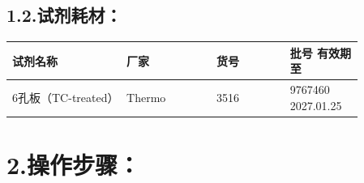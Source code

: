 \documentclass[UTF8,10pt,a4paper,fontset=fandol]{ctexart}
\newcommand{\fieldvalue}[1]{#1}
\newcommand{\handwritten}[1]{#1}
\begin{document}
\subsection*{1.2.\quad 试剂耗材：}

\begin{center}
\begin{tabular}{|p{0.28\linewidth}|p{0.22\linewidth}|p{0.18\linewidth}|p{0.18\linewidth}|}
\hline
试剂名称 & 厂家 & 货号 & 批号 \quad\quad 有效期至\\
\hline
6孔板（TC-treated） &
\fieldvalue{Thermo} &
\fieldvalue{3516} &
\fieldvalue{\handwritten{9767460}}
\quad
\fieldvalue{\handwritten{2027.01.25}}\\
\hline
\end{tabular}
\end{center}

\section*{2.\quad 操作步骤：}
\end{document}
